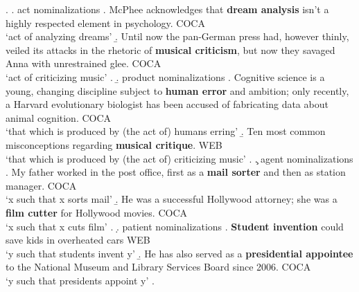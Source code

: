\ex. \a. act nominalizations
\a. \label{ex:dream_analysis}
McPhee acknowledges that \textbf{dream analysis} isn't a highly respected element
in psychology. COCA
\\`act of analyzing dreams'
\b. \label{ex:musical_criticism}%
Until now the pan-German press had, however thinly, veiled its attacks in the
rhetoric of \textbf{musical criticism}, but now they savaged Anna with unrestrained
glee. COCA
\\ `act of criticizing music'
\z. 
\b. product nominalizations
\a. \label{ex:human_error}%
Cognitive science is a young, changing discipline subject to \textbf{human error} and
ambition; only recently, a Harvard evolutionary biologist has been accused of
fabricating data about animal cognition. COCA
\\`that which is produced by (the act of) humans erring'
\b. \label{ex:musical_critique}%
Ten most common misconceptions regarding \textbf{musical critique}. WEB
\\ `that which is produced by (the act of)
criticizing music'
\z. 
\c. agent nominalizations
\a. \label{ex:mail_sorter}%
 My father worked in the post office, first as a \textbf{mail sorter} and then as
 station manager. COCA
\\`x such that x sorts mail'
\b. \label{ex:film_cutter}%
 He was a successful Hollywood attorney; she was a \textbf{film cutter} for Hollywood
 movies. COCA
\\`x such that x cuts film'
\z. 
\d. patient nominalizations
\a. \label{ex:student_invention}%
\textbf{Student invention} could save kids in overheated cars WEB
\\`y such that students invent y' %
\b. \label{ex:presidential_appointee}%
 He has also served as a \textbf{presidential appointee} to the National Museum and
 Library Services Board since 2006. COCA 
\\`y such that presidents appoint y'
\z. %

